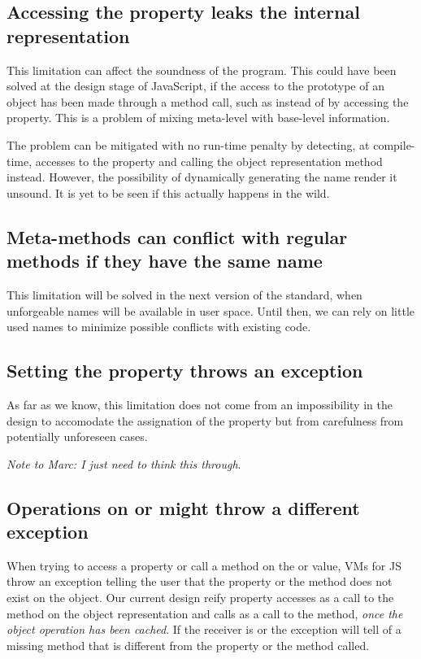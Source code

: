 \subsection{Accessing the  property leaks the internal representation}

This limitation can affect the soundness of the program. This could have been
solved at the design stage of JavaScript, if the access to the prototype of an
object has been made through a method call, such as  instead
of by accessing the  property. This is a problem of mixing
meta-level with base-level information.

The problem can be mitigated with no run-time penalty by detecting, at
compile-time, accesses to the  property and calling the object
representation  method instead. However, the possibility of
dynamically generating the  name render it unsound. It
is yet to be seen if this actually happens in the wild.

\subsection{Meta-methods can conflict with regular methods if they have the same name}

This limitation will be solved in the next version of the standard, when
unforgeable names will be available in user space.  Until then, we can rely on
little used names to minimize possible conflicts with existing code.

\subsection{Setting the  property throws an exception}

As far as we know, this limitation does not come from an impossibility in the
design to accomodate the assignation of the  property but from
carefulness from potentially unforeseen cases. 

\textit{Note to Marc: I just need to think this through}. 


\subsection{Operations on  or  might throw a different exception}

When trying to access a property or call a method on the  or
 value, VMs for JS throw an exception telling the user that the
property or the method does not exist on the object. Our current design reify
property accesses as a call to the  method on the object representation
and calls as a call to the  method, \textit{once the object operation
has been cached}. If the receiver is  or  the exception
will tell of a missing method that is different from the property or the method
called.

